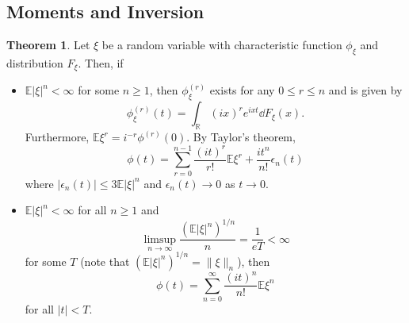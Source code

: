 \documentclass[]{article}
\theoremstyle{definition}
\newtheorem{theorem}{Theorem}
\theoremstyle{definition}
\begin{document}
\subsection{Moments and Inversion}

\begin{theorem}
  Let \(\xi\) be a random variable with characteristic function \(\phi_\xi\) 
  and distribution \(F_\xi\). Then, if 
  \begin{itemize}
    \item \(\mathbb{E}|\xi|^n < \infty\) for some \(n \ge 1\), then 
      \(\phi_\xi^{(r)}\) exists for any \(0 \le r \le n\) and is given by
    \[\phi_\xi^{(r)}(t) = \int_{\mathbb{R}} (ix)^r e^{ixt} \dd F_\xi(x).\]
      Furthermore, \(\mathbb{E}\xi^r = i^{-r} \phi^{(r)}(0)\). By Taylor's theorem, 
    \[\phi(t) = \sum_{r = 0}^{n - 1} \frac{(it)^r}{r!} \mathbb{E}\xi^r + 
      \frac{it^n}{n!}\epsilon_n(t)\]
      where \(|\epsilon_n(t)| \le 3 \mathbb{E}|\xi|^n\) and \(\epsilon_n(t) \to 0\) 
      as \(t \to 0\).
    \item \(\mathbb{E}|\xi|^n < \infty\) for all \(n \ge 1\) and 
  \[\limsup_{n \to \infty} \frac{(\mathbb{E}|\xi|^n)^{1 / n}}{n} = \frac{1}{eT} < \infty\]
    for some \(T\) (note that \((\mathbb{E}|\xi|^n)^{1 / n} = \|\xi\|_n\)), then 
  \[\phi(t) = \sum_{n = 0}^\infty \frac{(it)^n}{n!}\mathbb{E}\xi^n\]
    for all \(|t| < T\). 
  \end{itemize}
\end{theorem}
\end{document}
